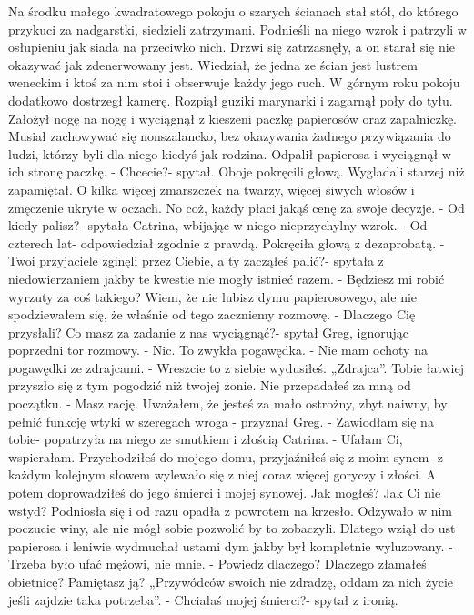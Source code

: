 \documentclass[12pt,a4paper]{book}
\begin{document}
Na środku małego kwadratowego pokoju o szarych ścianach stał stół, do którego przykuci za nadgarstki, siedzieli zatrzymani. Podnieśli na niego wzrok i patrzyli w osłupieniu jak siada na przeciwko nich. Drzwi się zatrzasnęły, a on starał się nie okazywać jak zdenerwowany jest. Wiedział, że jedna ze ścian jest lustrem weneckim i ktoś za nim stoi i obserwuje każdy jego ruch.  W górnym roku pokoju dodatkowo dostrzegł kamerę. Rozpiął guziki marynarki i zagarnął poły do tyłu. Założył nogę na nogę i wyciągnął z kieszeni paczkę papierosów oraz zapalniczkę. Musiał zachowywać się nonszalancko, bez okazywania żadnego przywiązania do ludzi, którzy byli dla niego kiedyś jak rodzina. Odpalił papierosa i wyciągnął w ich stronę paczkę.
- Chcecie?- spytał.
Oboje pokręcili głową. Wygladali starzej niż zapamiętał. O kilka więcej zmarszczek na twarzy, więcej siwych włosów i zmęczenie ukryte w oczach. No coż, każdy płaci jakąś cenę za swoje decyzje. 
- Od kiedy palisz?- spytała Catrina, wbijając w niego nieprzychylny wzrok. 
- Od czterech lat- odpowiedział zgodnie z prawdą. 
Pokręciła głową z dezaprobatą. 
- Twoi przyjaciele zginęli przez Ciebie, a ty zacząłeś palić?- spytała z niedowierzaniem jakby te kwestie nie mogły istnieć razem. 
- Będziesz mi robić wyrzuty za coś takiego? Wiem, że nie lubisz dymu
papierosowego, ale nie spodziewałem się, że właśnie od tego zaczniemy rozmowę. 
- Dlaczego Cię przysłali? Co masz za zadanie z nas wyciągnąć?- spytał Greg, ignorując poprzedni tor rozmowy. 
- Nic. To zwykła pogawędka. 
- Nie mam ochoty na pogawędki ze zdrajcami. 
- Wreszcie to z siebie wydusiłeś. „Zdrajca”. Tobie łatwiej przyszło się z tym pogodzić niż twojej żonie. Nie przepadałeś za mną od początku. 
-  Masz rację. Uważałem, że jesteś za mało ostrożny, zbyt naiwny, by pełnić funkcję wtyki w szeregach wroga - przyznał Greg. 
- Zawiodłam się na tobie- popatrzyła na niego ze smutkiem i złością Catrina. - Ufałam Ci, wspierałam. Przychodziłeś do mojego domu, przyjaźniłeś się z moim synem-  z każdym kolejnym słowem wylewało się z niej coraz więcej goryczy i złości. A potem doprowadziłeś do jego śmierci i mojej synowej. Jak mogłeś? Jak Ci nie wstyd?
Podniosła się i od razu opadła z powrotem na krzesło. 
Odżywało w nim poczucie winy, ale nie mógł sobie pozwolić by to zobaczyli. Dlatego wziął do ust papierosa i leniwie wydmuchał ustami dym jakby był kompletnie wyluzowany. 
- Trzeba było ufać mężowi, nie mnie. 
- Powiedz dlaczego? Dlaczego złamałeś obietnicę? Pamiętasz ją? „Przywódców swoich nie zdradzę, oddam za nich życie jeśli zajdzie taka potrzeba”. 
- Chciałaś mojej śmierci?- spytał z ironią.
\end{document}
